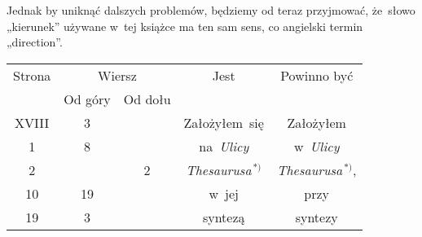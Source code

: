 \documentclass[a4paper,11pt]{article}
\numberwithin{equation}{section}
\begin{document}
Jednak by uniknąć dalszych problemów, będziemy od teraz przyjmować, że~słowo
„kierunek” używane w~tej książce ma ten sam sens, co angielski termin
„direction”.

\VerSpaceFour





































\newpage



\begin{center}

  \begin{tabular}{|c|c|c|c|c|}
    \hline
    Strona & \multicolumn{2}{c|}{Wiersz} & Jest
    & Powinno być \\ \cline{2-3}
    & Od góry & Od dołu & & \\
    \hline
    XVIII & \hphantom{0}3 & & Założyłem~się & Założyłem \\
    \hphantom{0}1 & \hphantom{0}8 & & na~\textit{Ulicy} & w~\textit{Ulicy} \\
    \hphantom{0}2 & & \hphantom{0}2 & \textit{Thesaurusa}$^{ \, *) }$
    & \textit{Thesaurusa}$^{ \, *) }$, \\
    10 & 19 & & w~jej & przy \\
    19 & \hphantom{0}3 & & syntezą & syntezy \\
    \hline
  \end{tabular}

\end{center}

\VerSpaceTwo
\end{document}
